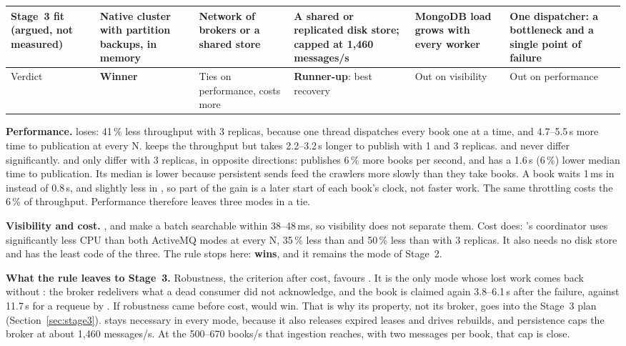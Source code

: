 \begin{table}[ht]
\begin{tabularx}{\textwidth}{@{}L{2.45cm}YYYYY@{}}
\addlinespace
Stage~3 fit (argued, not measured) & Native cluster with partition backups, in memory & Network of brokers or a shared store & A shared or replicated disk store; capped at 1{,}460 messages/s & MongoDB load grows with every worker & One dispatcher: a bottleneck and a single point of failure \\
\midrule
Verdict & \textbf{Winner} & Ties on performance, costs more & \textbf{Runner-up}: best recovery & Out on visibility & Out on performance \\
\bottomrule
\end{tabularx}
\end{table}

\textbf{Performance.}  loses: 41\,\% less throughput with 3 replicas, because one thread dispatches
every book one  at a time, and 4.7--5.5\,s more time to publication at every N.  keeps the
throughput but takes 2.2--3.2\,s longer to publish with 1 and 3 replicas.  and  never
differ significantly.  and  only differ with 3 replicas, in opposite
directions:  publishes 6\,\% more books per second, and  has a 1.6\,s (6\,\%)
lower median time to publication. Its median is lower because persistent sends feed the crawlers more slowly than they
take books. A book waits 1\,ms in  instead of 0.8\,s, and slightly less in
, so part of the gain is a later start of each book's clock, not faster work. The same throttling
costs the 6\,\% of throughput. Performance therefore leaves three modes in a tie.

\textbf{Visibility and cost.} ,  and  make a batch searchable
within 38--48\,ms, so visibility does not separate them. Cost does: 's coordinator uses significantly
less CPU than both ActiveMQ modes at every N, 35\,\% less than  and 50\,\% less than
 with 3 replicas. It also needs no disk store and has the least code of the three. The rule
stops here: \textbf{ wins}, and it remains the mode of Stage~2.

\textbf{What the rule leaves to Stage~3.} Robustness, the criterion after cost, favours .
It is the only mode whose lost work comes back without : the broker redelivers what a dead consumer did
not acknowledge, and the book is claimed again 3.8--6.1\,s after the failure, against 11.7\,s for a requeue by
. If robustness came before cost,  would win. That is why its property, not its
broker, goes into the Stage~3 plan (Section~\ref{sec:stage3}).  stays necessary in every mode, because it
also releases expired leases and drives rebuilds, and persistence caps the broker at about 1{,}460 messages/s. At the
500--670 books/s that ingestion reaches, with two messages per book, that cap is close.

